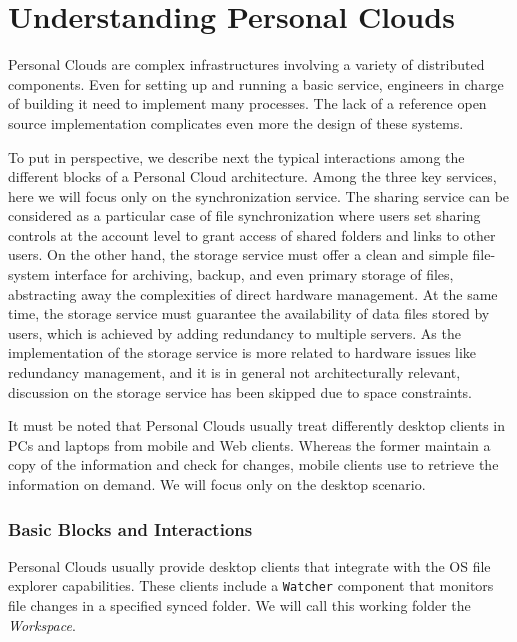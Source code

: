 \chapter{Understanding Personal Clouds}

Personal Clouds are complex infrastructures involving a variety of distributed components. 
Even for setting up and running a basic service, engineers in charge of building it need 
to implement many processes. The lack of a reference open source implementation complicates
even more the design of these systems. 

To put in perspective, we describe next the typical interactions among the
different blocks of a Personal Cloud architecture. Among the three key services, here we will
focus only on the synchronization service. The sharing service can be considered as a
particular case of file synchronization where users set sharing controls at the account
level to grant access of shared folders and links to other users. On the other hand, the
storage service must offer a clean and simple file-system interface for archiving, backup,
and even primary storage of files, abstracting away the complexities of direct hardware
management. At the same time, the storage service must guarantee the availability of data
files stored by users, which is achieved by adding redundancy to multiple servers. As the
implementation of the storage service is more related to hardware issues like redundancy
management, and it is in general not architecturally relevant, discussion on the storage
service has been skipped due to space constraints.


It must be noted that Personal Clouds usually treat differently desktop clients in PCs and
laptops from mobile and Web clients. Whereas the former maintain a copy of the information
and check for changes, mobile clients use to retrieve the information on demand. We will focus
only on the desktop scenario.

\subsection{Basic Blocks and Interactions}

Personal Clouds usually provide desktop clients that integrate with the OS file explorer capabilities. 
These clients include a \texttt{Watcher} component that monitors file changes in a specified 
synced folder. We will call this working folder the \textit{Workspace}.


